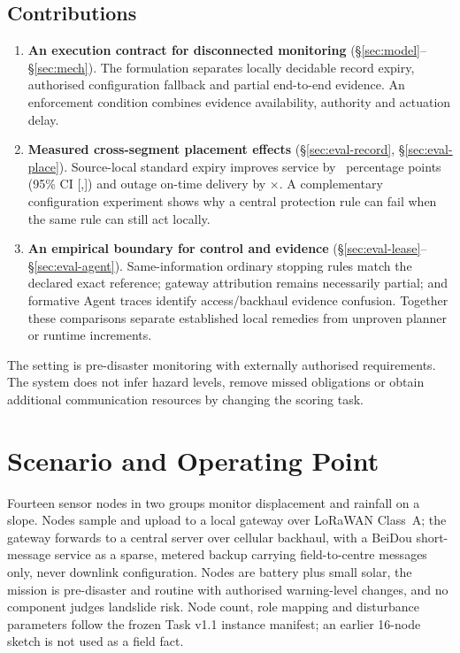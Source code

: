 \documentclass[journal,10pt]{IEEEtran}
\begin{document}
\subsection{Contributions}
\begin{enumerate}
\item \textbf{An execution contract for disconnected monitoring}
(\S\ref{sec:model}--\S\ref{sec:mech}). The formulation separates locally decidable record
expiry, authorised configuration fallback and partial end-to-end evidence. An enforcement
condition combines evidence availability, authority and actuation delay.
\item \textbf{Measured cross-segment placement effects}
(\S\ref{sec:eval-record}, \S\ref{sec:eval-place}). Source-local standard expiry improves
service by \cThreePairedPoints\ percentage points (95\% CI
[\cThreePairedLo,\cThreePairedHi]) and outage on-time delivery by \cThreeRatio$\times$.
A complementary configuration experiment shows why a central protection rule can fail when
the same rule can still act locally.
\item \textbf{An empirical boundary for control and evidence}
(\S\ref{sec:eval-lease}--\S\ref{sec:eval-agent}). Same-information ordinary stopping rules
match the declared exact reference; gateway attribution remains necessarily partial; and
formative Agent traces identify access/backhaul evidence confusion. Together these comparisons
separate established local remedies from unproven planner or runtime increments.
\end{enumerate}
The setting is pre-disaster monitoring with externally authorised requirements. The system does
not infer hazard levels, remove missed obligations or obtain additional communication resources
by changing the scoring task.

\section{Scenario and Operating Point}
\label{sec:bg}

Fourteen sensor nodes in two groups monitor displacement and rainfall on a slope. Nodes sample
and upload to a local gateway over LoRaWAN Class~A; the gateway forwards to a central server over
cellular backhaul, with a BeiDou short-message service as a sparse, metered backup carrying
field-to-centre messages only, never downlink configuration. Nodes are battery plus small solar,
the mission is pre-disaster and routine with authorised warning-level changes, and no component
judges landslide risk. Node count, role mapping and disturbance parameters follow the frozen Task
v1.1 instance manifest; an earlier 16-node sketch is not used as a field fact.
\end{document}

